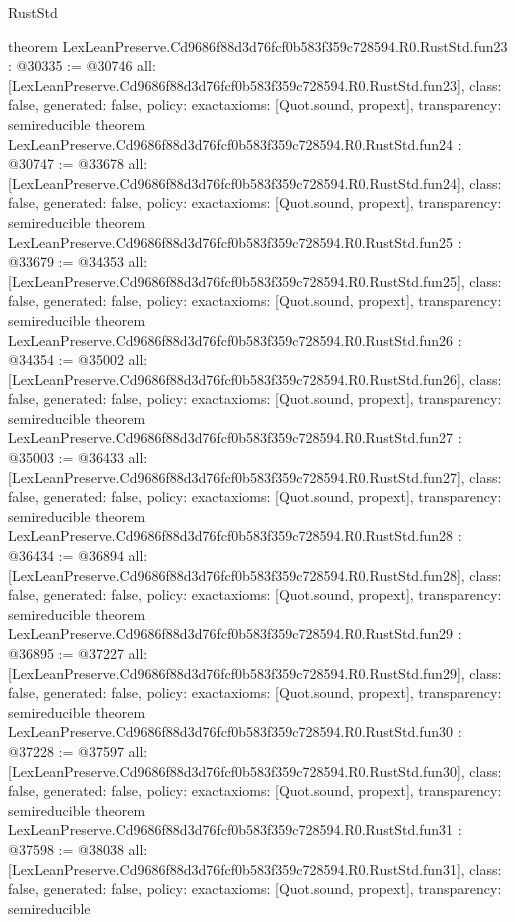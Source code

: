 \begin{lexlean}{RustStd}
\begin{coremodule}
{}
theorem LexLeanPreserve.Cd9686f88d3d76fcf0b583f359c728594.R0.RustStd.fun23 : @30335 := @30746 {
  all: [LexLeanPreserve.Cd9686f88d3d76fcf0b583f359c728594.R0.RustStd.fun23],
  class: false,
  generated: false,
  policy: exact{axioms: [Quot.sound, propext]},
  transparency: semireducible
}
theorem LexLeanPreserve.Cd9686f88d3d76fcf0b583f359c728594.R0.RustStd.fun24 : @30747 := @33678 {
  all: [LexLeanPreserve.Cd9686f88d3d76fcf0b583f359c728594.R0.RustStd.fun24],
  class: false,
  generated: false,
  policy: exact{axioms: [Quot.sound, propext]},
  transparency: semireducible
}
theorem LexLeanPreserve.Cd9686f88d3d76fcf0b583f359c728594.R0.RustStd.fun25 : @33679 := @34353 {
  all: [LexLeanPreserve.Cd9686f88d3d76fcf0b583f359c728594.R0.RustStd.fun25],
  class: false,
  generated: false,
  policy: exact{axioms: [Quot.sound, propext]},
  transparency: semireducible
}
theorem LexLeanPreserve.Cd9686f88d3d76fcf0b583f359c728594.R0.RustStd.fun26 : @34354 := @35002 {
  all: [LexLeanPreserve.Cd9686f88d3d76fcf0b583f359c728594.R0.RustStd.fun26],
  class: false,
  generated: false,
  policy: exact{axioms: [Quot.sound, propext]},
  transparency: semireducible
}
theorem LexLeanPreserve.Cd9686f88d3d76fcf0b583f359c728594.R0.RustStd.fun27 : @35003 := @36433 {
  all: [LexLeanPreserve.Cd9686f88d3d76fcf0b583f359c728594.R0.RustStd.fun27],
  class: false,
  generated: false,
  policy: exact{axioms: [Quot.sound, propext]},
  transparency: semireducible
}
theorem LexLeanPreserve.Cd9686f88d3d76fcf0b583f359c728594.R0.RustStd.fun28 : @36434 := @36894 {
  all: [LexLeanPreserve.Cd9686f88d3d76fcf0b583f359c728594.R0.RustStd.fun28],
  class: false,
  generated: false,
  policy: exact{axioms: [Quot.sound, propext]},
  transparency: semireducible
}
theorem LexLeanPreserve.Cd9686f88d3d76fcf0b583f359c728594.R0.RustStd.fun29 : @36895 := @37227 {
  all: [LexLeanPreserve.Cd9686f88d3d76fcf0b583f359c728594.R0.RustStd.fun29],
  class: false,
  generated: false,
  policy: exact{axioms: [Quot.sound, propext]},
  transparency: semireducible
}
theorem LexLeanPreserve.Cd9686f88d3d76fcf0b583f359c728594.R0.RustStd.fun30 : @37228 := @37597 {
  all: [LexLeanPreserve.Cd9686f88d3d76fcf0b583f359c728594.R0.RustStd.fun30],
  class: false,
  generated: false,
  policy: exact{axioms: [Quot.sound, propext]},
  transparency: semireducible
}
theorem LexLeanPreserve.Cd9686f88d3d76fcf0b583f359c728594.R0.RustStd.fun31 : @37598 := @38038 {
  all: [LexLeanPreserve.Cd9686f88d3d76fcf0b583f359c728594.R0.RustStd.fun31],
  class: false,
  generated: false,
  policy: exact{axioms: [Quot.sound, propext]},
  transparency: semireducible
}
\end{coremodule}
\end{lexlean}
